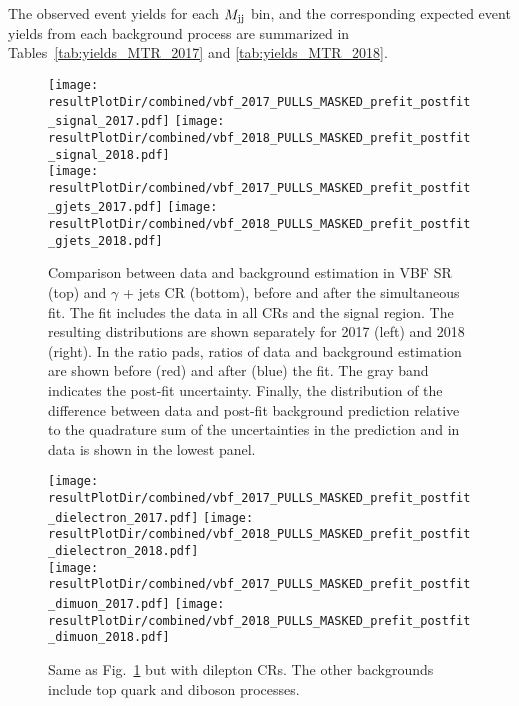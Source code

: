 The observed event yields for each $M_{\textrm{jj}}$ bin, and the corresponding expected event yields from each background process are summarized in Tables~\ref{tab:yields_MTR_2017} and
\ref{tab:yields_MTR_2018}.

\begin{figure}[htbp]
    \centering
        \texttt{[image: \\resultPlotDir/combined/vbf\_2017\_PULLS\_MASKED\_prefit\_postfit\_signal\_2017.pdf]}
        \texttt{[image: \\resultPlotDir/combined/vbf\_2018\_PULLS\_MASKED\_prefit\_postfit\_signal\_2018.pdf]} \\
        \texttt{[image: \\resultPlotDir/combined/vbf\_2017\_PULLS\_MASKED\_prefit\_postfit\_gjets\_2017.pdf]}
        \texttt{[image: \\resultPlotDir/combined/vbf\_2018\_PULLS\_MASKED\_prefit\_postfit\_gjets\_2018.pdf]}
    \caption{Comparison between data and background estimation in VBF SR (top) and $\gamma$ + jets CR (bottom),
    before and after the simultaneous fit. The fit includes the data in all CRs and the signal region. The resulting
    distributions are shown separately for 2017 (left) and 2018 (right). In the ratio pads, ratios of data and background
    estimation are shown before (red) and after (blue) the fit. The gray band indicates the post-fit uncertainty.
    Finally, the distribution of the difference between data and post-fit background prediction relative to the quadrature sum of
    the uncertainties in the prediction and in data is shown in the lowest panel.}
    \label{fig:pre_postfit_sr_and_gamma}
\end{figure}

\begin{figure}[htbp]
    \centering
        \texttt{[image: \\resultPlotDir/combined/vbf\_2017\_PULLS\_MASKED\_prefit\_postfit\_dielectron\_2017.pdf]}
        \texttt{[image: \\resultPlotDir/combined/vbf\_2018\_PULLS\_MASKED\_prefit\_postfit\_dielectron\_2018.pdf]} \\
        \texttt{[image: \\resultPlotDir/combined/vbf\_2017\_PULLS\_MASKED\_prefit\_postfit\_dimuon\_2017.pdf]}
        \texttt{[image: \\resultPlotDir/combined/vbf\_2018\_PULLS\_MASKED\_prefit\_postfit\_dimuon\_2018.pdf]}
    \caption{Same as Fig.~\ref{fig:pre_postfit_sr_and_gamma} but with dilepton CRs. The other backgrounds include top 
    quark and diboson processes.}
    \label{fig:pre_postfit_dilepton_regions}
\end{figure}

